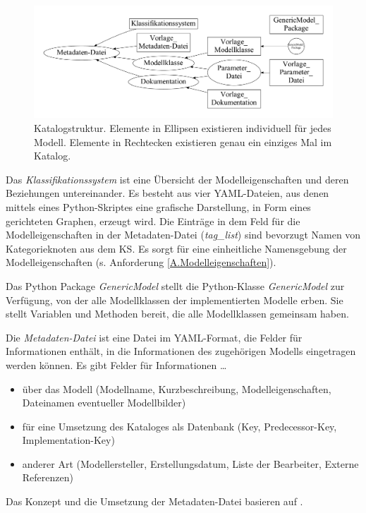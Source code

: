 \begin{figure}[H]
	\centering
	\includegraphics[width=1\linewidth]{Katalogstruktur}
	\caption[Katalogstruktur]{Katalogstruktur. Elemente in Ellipsen existieren individuell für jedes Modell. Elemente in Rechtecken existieren genau ein einziges Mal im Katalog.}
	\label{fig:Katalogstruktur}
\end{figure}
%
Das \textit{Klassifikationssystem} ist eine Übersicht der Modelleigenschaften und deren Beziehungen untereinander. Es besteht aus vier YAML-Dateien, aus denen mittels eines Python-Skriptes eine grafische Darstellung, in Form eines gerichteten Graphen, erzeugt wird. Die Einträge in dem Feld für die Modelleigenschaften in der Metadaten-Datei (\textit{tag\_list}) sind bevorzugt Namen von Kategorieknoten aus dem KS. Es sorgt für eine einheitliche Namensgebung der Modelleigenschaften (s. Anforderung \ref{A.Modelleigenschaften}). 

Das Python Package \textit{GenericModel} stellt die Python-Klasse \textit{GenericModel} zur Verfügung, von der alle Modellklassen der implementierten Modelle erben. Sie stellt Variablen und Methoden bereit, die alle Modellklassen gemeinsam haben.

Die \textit{Metadaten-Datei} ist eine Datei im YAML-Format, die Felder für Informationen enthält, in die Informationen des zugehörigen Modells eingetragen werden können. Es gibt Felder für Informationen \dots 
\begin{itemize}[label=$\bullet$]
	\item über das Modell (Modellname, Kurzbeschreibung, Modelleigenschaften, Dateinamen eventueller Modellbilder)
	\item für eine Umsetzung des Kataloges als Datenbank (Key, Predecessor-Key, Implementation-Key)
	\item anderer Art (Modellersteller, Erstellungsdatum, Liste der Bearbeiter, Externe Referenzen)
\end{itemize}
Das Konzept und die Umsetzung der Metadaten-Datei basieren auf \cite{KNHE20b}. 

